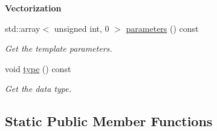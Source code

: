 \begin{Indent}{\bf Vectorization}
\begin{DoxyCompactItemize}
std\-::array$<$ unsigned int, 0 $>$ \hyperlink{classmagrathea_1_1Vectorizer_a7815b5c9e9ff56064306e7d07dae5bb7}{parameters} () const 
\begin{DoxyCompactList}\small\item\em Get the template parameters. \end{DoxyCompactList}\item 
void \hyperlink{classmagrathea_1_1Vectorizer_af46ebf417fa856107cb9b84db9939f76}{type} () const 
\begin{DoxyCompactList}\small\item\em Get the data type. \end{DoxyCompactList}\end{DoxyCompactItemize}
\end{Indent}
\subsection*{Static Public Member Functions}
